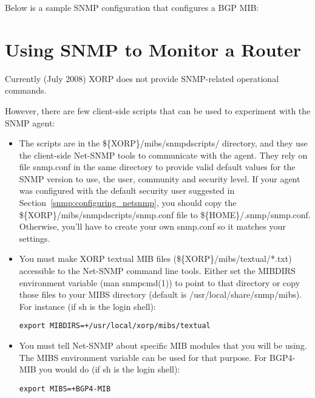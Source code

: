 Below is a sample SNMP configuration that configures a BGP MIB:

\vspace{0.1in}
\noindent{}
\vspace{0.1in}

\section{Using SNMP to Monitor a Router}

Currently (July 2008) XORP does not provide SNMP-related operational
commands.

However, there are few client-side scripts that can be used to experiment
with the SNMP agent:

\begin{itemize}
  \item The scripts are in the
  {\stt \$\{XORP\}/mibs/snmpdscripts/} directory, and they use the client-side
  Net-SNMP tools to communicate with the agent.  They rely on file
  {\stt snmp.conf} in the same directory to provide valid default values for
  the SNMP version to use, the user, community and security level. If your
  agent was configured with the default security user suggested in
  Section~\ref{snmp:configuring_netsnmp}, you should copy the
  {\stt \$\{XORP\}/mibs/snmpdscripts/snmp.conf} file to
  {\stt \$\{HOME\}/.snmp/snmp.conf}. Otherwise, you'll have to create your
  own {\stt snmp.conf} so it matches your settings.

  \item You must make XORP textual MIB files
  ({\stt \$\{XORP\}/mibs/textual/*.txt}) accessible to the Net-SNMP command
  line tools.  Either set the {\stt MIBDIRS} environment variable
  ({\stt man snmpcmd(1)}) to point to that directory or copy those files to
  your MIBS directory (default is {\stt /usr/local/share/snmp/mibs}).  For
  instance (if {\stt sh} is the login shell):

  {\tt export MIBDIRS=+/usr/local/xorp/mibs/textual}

  \item You must tell Net-SNMP about specific MIB modules that you will
  be using.  The {\stt MIBS} environment variable can be used for that
  purpose. For BGP4-MIB you would do (if {\stt sh} is the login shell):

  {\tt export MIBS=+BGP4-MIB}

\end{itemize}
